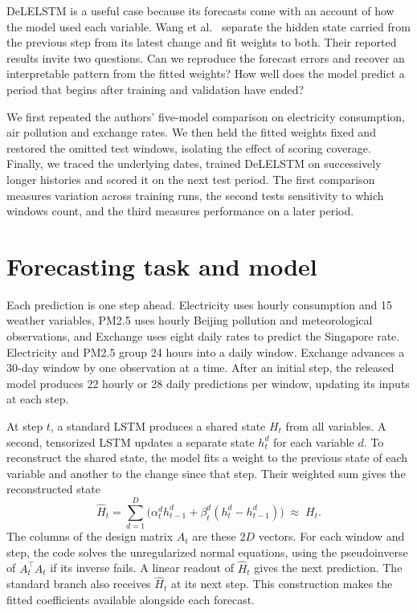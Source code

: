 \documentclass[10pt,a4paper]{article}
\begin{document}
DeLELSTM is a useful case because its forecasts come with an account of how the model used each variable. Wang et al.~\cite{wang} separate the hidden state carried from the previous step from its latest change and fit weights to both. Their reported results invite two questions. Can we reproduce the forecast errors and recover an interpretable pattern from the fitted weights? How well does the model predict a period that begins after training and validation have ended?

We first repeated the authors' five-model comparison on electricity consumption, air pollution and exchange rates. We then held the fitted weights fixed and restored the omitted test windows, isolating the effect of scoring coverage. Finally, we traced the underlying dates, trained DeLELSTM on successively longer histories and scored it on the next test period. The first comparison measures variation across training runs, the second tests sensitivity to which windows count, and the third measures performance on a later period.

\section{Forecasting task and model}\label{sec:model}
Each prediction is one step ahead. Electricity uses hourly consumption and 15 weather variables, PM2.5 uses hourly Beijing pollution and meteorological observations, and Exchange uses eight daily rates to predict the Singapore rate. Electricity and PM2.5 group 24 hours into a daily window. Exchange advances a 30-day window by one observation at a time. After an initial step, the released model produces 22 hourly or 28 daily predictions per window, updating its inputs at each step.

\newpage
At step \(t\), a standard LSTM produces a shared state \(H_t\) from all variables. A second, tensorized LSTM updates a separate state \(h_t^d\) for each variable \(d\). To reconstruct the shared state, the model fits a weight to the previous state of each variable and another to the change since that step. Their weighted sum gives the reconstructed state
\[
  \widehat H_t = \sum_{d=1}^D
    \bigl(\alpha_t^d h_{t-1}^d + \beta_t^d (h_t^d-h_{t-1}^d)\bigr)
  \;\approx\; H_t .
\]
The columns of the design matrix \(A_t\) are these \(2D\) vectors. For each window and step, the code solves the unregularized normal equations, using the pseudoinverse of \(A_t^\top A_t\) if its inverse fails. A linear readout of \(\widehat H_t\) gives the next prediction. The standard branch also receives \(\widehat H_t\) at its next step. This construction makes the fitted coefficients available alongside each forecast.
\end{document}
